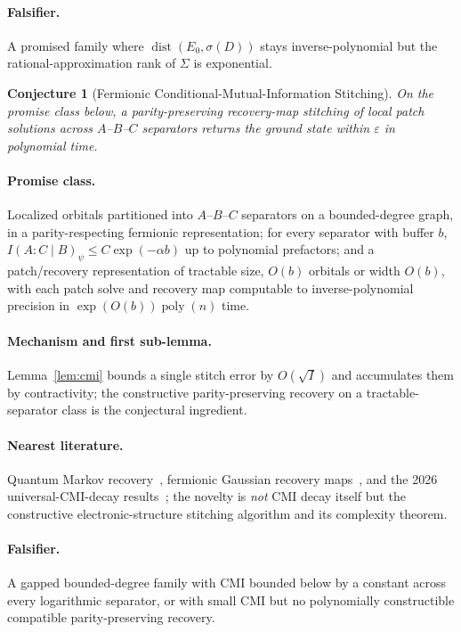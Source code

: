 \documentclass[11pt]{article}
\newtheorem{conjecture}{Conjecture}
\theoremstyle{definition}
\newcommand{\eps}{\varepsilon}
\newcommand{\poly}{\operatorname{poly}}
\DeclareMathOperator{\dist}{dist}
\begin{document}
\paragraph{Falsifier.}  A promised family where $\dist(E_0,\sigma(D))$ stays
inverse-polynomial but the rational-approximation rank of $\Sigma$ is exponential.

\begin{conjecture}[Fermionic Conditional-Mutual-Information Stitching]\label{p6}
On the promise class below, a parity-preserving recovery-map stitching of local
patch solutions across $A$--$B$--$C$ separators returns the ground state within
$\eps$ in polynomial time.
\end{conjecture}
\paragraph{Promise class.}  Localized orbitals partitioned into $A$--$B$--$C$
separators on a bounded-degree graph, in a parity-respecting fermionic
representation; for every separator with buffer $b$,
$I(A:C\mid B)_\psi\le C\exp(-\alpha b)$ up to polynomial prefactors; and a
patch/recovery representation of tractable size, $O(b)$ orbitals or width $O(b)$,
with each patch solve and recovery map computable to inverse-polynomial precision
in $\exp(O(b))\poly(n)$ time.
\paragraph{Mechanism and first sub-lemma.}  Lemma~\ref{lem:cmi} bounds a single
stitch error by $O(\sqrt I)$ and accumulates them by contractivity; the
constructive parity-preserving recovery on a tractable-separator class is the
conjectural ingredient.
\paragraph{Nearest literature.}  Quantum Markov recovery~\cite{R13}, fermionic
Gaussian recovery maps~\cite{R14}, and the 2026 universal-CMI-decay
results~\cite{R22}; the novelty is \emph{not} CMI decay itself but the
constructive electronic-structure stitching algorithm and its complexity theorem.
\paragraph{Falsifier.}  A gapped bounded-degree family with CMI bounded below by a
constant across every logarithmic separator, or with small CMI but no
polynomially constructible compatible parity-preserving recovery.
\end{document}
